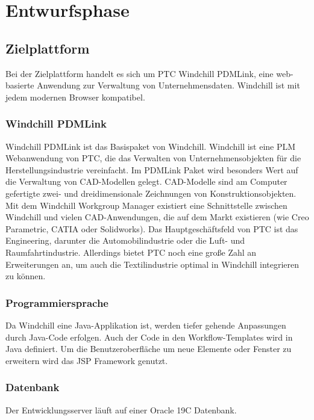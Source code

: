 \section{Entwurfsphase} 
\label{sec:Entwurfsphase}

\subsection{Zielplattform}
\label{sec:Zielplattform}

Bei der Zielplattform handelt es sich um PTC Windchill PDMLink, eine web-basierte Anwendung zur Verwaltung von Unternehmensdaten.
Windchill ist mit jedem modernen Browser kompatibel.

\subsubsection{Windchill PDMLink}
Windchill PDMLink ist das Basispaket von Windchill.
Windchill ist eine \ac{PLM} Webanwendung von PTC, die das Verwalten von Unternehmensobjekten für die Herstellungsindustrie vereinfacht.
Im PDMLink Paket wird besonders Wert auf die Verwaltung von CAD-Modellen gelegt.
CAD-Modelle sind am Computer gefertigte zwei- und dreidimensionale Zeichnungen von Konstruktionsobjekten.
Mit dem Windchill Workgroup Manager existiert eine Schnittstelle zwischen Windchill und vielen CAD-Anwendungen, die auf dem Markt existieren (wie \zB Creo Parametric, CATIA oder Solidworks).
Das Hauptgeschäftsfeld von PTC ist das Engineering, darunter \zB die Automobilindustrie oder die Luft- und Raumfahrtindustrie.
Allerdings bietet PTC noch eine große Zahl an Erweiterungen an, um \zB auch die Textilindustrie optimal in Windchill integrieren zu können.

\subsubsection{Programmiersprache}
Da Windchill eine Java-Applikation ist, werden tiefer gehende Anpassungen durch Java-Code erfolgen.
Auch der Code in den Workflow-Templates wird in Java definiert.
Um die Benutzeroberfläche um neue Elemente oder Fenster zu erweitern wird das JSP Framework genutzt.

\subsubsection{Datenbank}
Der Entwicklungsserver läuft auf einer Oracle 19C Datenbank.

